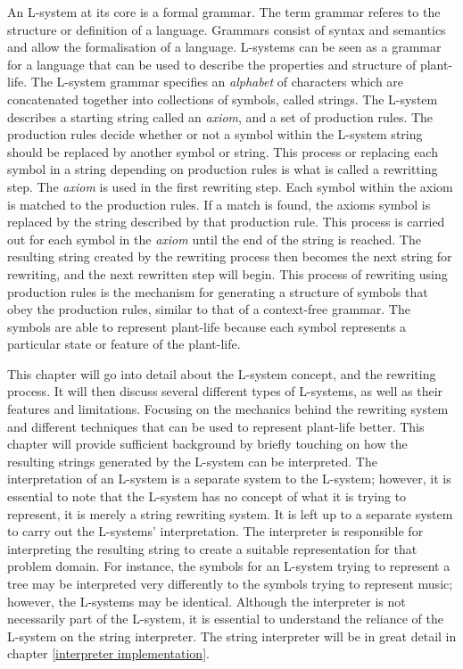 
\lettrine[lines=3]{A}{}n L-system at its core is a formal grammar. The term grammar referes to the structure or definition of a language. Grammars consist of syntax and semantics and allow the formalisation of a language. L-systems can be seen as a grammar for a language that can be used to describe the properties and structure of plant-life. The L-system grammar specifies an \textit{alphabet} of characters which are concatenated together into collections of symbols, called strings. The L-system describes a starting string called an \textit{axiom}, and a set of production rules. The production rules decide whether or not a symbol within the L-system string should be replaced by another symbol or string. This process or replacing each symbol in a string depending on production rules is what is called a rewritting step. The \textit{axiom} is used in the first rewriting step. Each symbol within the axiom is matched to the production rules. If a match is found, the axioms symbol is replaced by the string described by that production rule. This process is carried out for each symbol in the \textit{axiom} until the end of the string is reached. The resulting string created by the rewriting process then becomes the next string for rewriting, and the next rewritten step will begin. This process of rewriting using production rules is the mechanism for generating a structure of symbols that obey the production rules, similar to that of a context-free grammar. The symbols are able to represent plant-life because each symbol represents a particular state or feature of the plant-life. 

This chapter will go into detail about the L-system concept, and the rewriting process. It will then discuss several different types of L-systems, as well as their features and limitations. Focusing on the mechanics behind the rewriting system and different techniques that can be used to represent plant-life better. This chapter will provide sufficient background by briefly touching on how the resulting strings generated by the L-system can be interpreted. The interpretation of an L-system is a separate system to the L-system; however, it is essential to note that the L-system has no concept of what it is trying to represent, it is merely a string rewriting system. It is left up to a separate system to carry out the L-systems' interpretation. The interpreter is responsible for interpreting the resulting string to create a suitable representation for that problem domain. For instance, the symbols for an L-system trying to represent a tree may be interpreted very differently to the symbols trying to represent music; however, the L-systems may be identical. Although the interpreter is not necessarily part of the L-system, it is essential to understand the reliance of the L-system on the string interpreter. The string interpreter will be in great detail in chapter \ref{interpreter implementation}.

